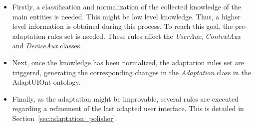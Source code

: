 \begin{itemize}
  \item Firstly, a classification and normalization of the collected knowledge of
  the main entities is needed. This might be low level knowledge. Thus, a higher
  level information is obtained during this process. To reach this goal, the
  pre-adaptation rules set is needed. These rules affect the \textit{UserAux},
  \textit{ContextAux} and \textit{DeviceAux} classes.
  
  \item Next, once the knowledge has been normalized, the adaptation rules set
  are triggered, generating the corresponding changes in the \textit{Adaptation}
  class in the AdaptUIOnt ontology.
  
  \item Finally, as the adaptation might be improvable, several rules are executed
  regarding a refinement of the last adapted user interface. This is detailed
  in Section~\ref{sec:adaptation_polisher}.
\end{itemize}